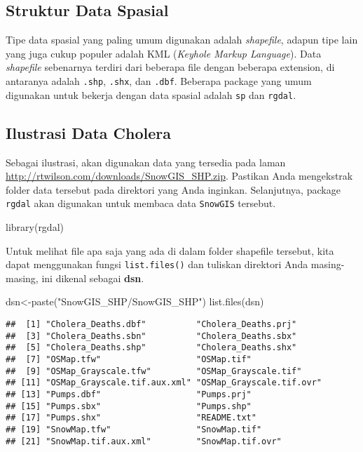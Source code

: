 \documentclass[
]{book}
\newenvironment{Shaded}{\begin{snugshade}}{\end{snugshade}}
\newcommand{\FunctionTok}[1]{\textcolor[rgb]{0.00,0.00,0.00}{#1}}
\newcommand{\NormalTok}[1]{#1}
\newcommand{\OtherTok}[1]{\textcolor[rgb]{0.56,0.35,0.01}{#1}}
\newcommand{\StringTok}[1]{\textcolor[rgb]{0.31,0.60,0.02}{#1}}
\begin{document}
\hypertarget{struktur-data-spasial}{%
\subsection{Struktur Data Spasial}\label{struktur-data-spasial}}

Tipe data spasial yang paling umum digunakan adalah \emph{shapefile}, adapun tipe lain yang juga cukup populer adalah KML (\emph{Keyhole Markup Language}). Data \emph{shapefile} sebenarnya terdiri dari beberapa file dengan beberapa extension, di antaranya adalah \texttt{.shp}, \texttt{.shx}, dan \texttt{.dbf}. Beberapa package yang umum digunakan untuk bekerja dengan data spasial adalah \texttt{sp} dan \texttt{rgdal}.

\hypertarget{ilustrasi-data-cholera}{%
\subsection{Ilustrasi Data Cholera}\label{ilustrasi-data-cholera}}

Sebagai ilustrasi, akan digunakan data yang tersedia pada laman \url{http://rtwilson.com/downloads/SnowGIS_SHP.zip}. Pastikan Anda mengekstrak folder data tersebut pada direktori yang Anda inginkan. Selanjutnya, package \texttt{rgdal} akan digunakan untuk membaca data \texttt{SnowGIS} tersebut.

\begin{Shaded}
\begin{Highlighting}[]
\FunctionTok{library}\NormalTok{(rgdal)}
\end{Highlighting}
\end{Shaded}

Untuk melihat file apa saja yang ada di dalam folder shapefile tersebut, kita dapat menggunakan fungsi \texttt{list.files()} dan tuliskan direktori Anda masing-masing, ini dikenal sebagai \textbf{dsn}.

\begin{Shaded}
\begin{Highlighting}[]
\NormalTok{dsn}\OtherTok{\textless{}{-}}\FunctionTok{paste}\NormalTok{(}\StringTok{"SnowGIS\_SHP/SnowGIS\_SHP"}\NormalTok{)}
\FunctionTok{list.files}\NormalTok{(dsn)}
\end{Highlighting}
\end{Shaded}

\begin{verbatim}
##  [1] "Cholera_Deaths.dbf"          "Cholera_Deaths.prj"         
##  [3] "Cholera_Deaths.sbn"          "Cholera_Deaths.sbx"         
##  [5] "Cholera_Deaths.shp"          "Cholera_Deaths.shx"         
##  [7] "OSMap.tfw"                   "OSMap.tif"                  
##  [9] "OSMap_Grayscale.tfw"         "OSMap_Grayscale.tif"        
## [11] "OSMap_Grayscale.tif.aux.xml" "OSMap_Grayscale.tif.ovr"    
## [13] "Pumps.dbf"                   "Pumps.prj"                  
## [15] "Pumps.sbx"                   "Pumps.shp"                  
## [17] "Pumps.shx"                   "README.txt"                 
## [19] "SnowMap.tfw"                 "SnowMap.tif"                
## [21] "SnowMap.tif.aux.xml"         "SnowMap.tif.ovr"
\end{verbatim}
\end{document}
